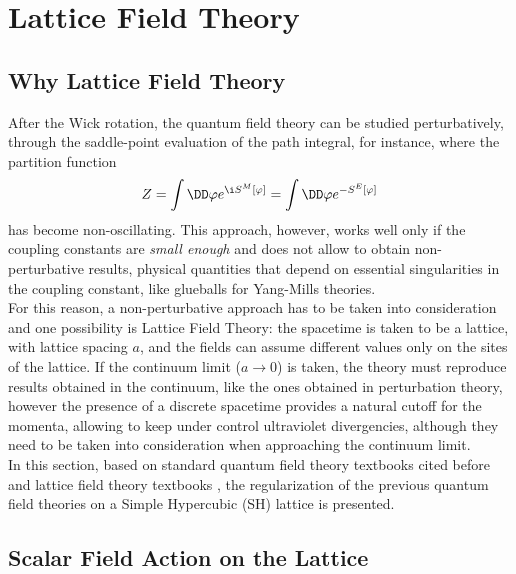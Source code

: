 \section{Lattice Field Theory}
\subsection{Why Lattice Field Theory}
After the Wick rotation, the quantum field theory can be studied perturbatively, through the saddle-point evaluation of the path integral, for instance, where the partition function
\begin{equation*}
    Z = \int\DD\varphi e^{\i S^M[\varphi]} = \int\DD\varphi e^{-S^E[\varphi]}
\end{equation*}
has become non-oscillating.
This approach, however, works well only if the coupling constants are \emph{small enough} and does not allow to obtain non-perturbative results, \ie physical quantities that depend on essential singularities in the coupling constant, like glueballs for Yang-Mills theories.\\
For this reason, a non-perturbative approach has to be taken into consideration and one possibility is Lattice Field Theory: the spacetime is taken to be a lattice, with lattice spacing $a$, and the fields can assume different values only on the sites of the lattice.
If the continuum limit ($a\to0$) is taken, the theory must reproduce results obtained in the continuum, like the ones obtained in perturbation theory, however the presence of a discrete spacetime provides a natural cutoff for the momenta, allowing to keep under control ultraviolet divergencies, although they need to be taken into consideration when approaching the continuum limit.\\
In this section, based on standard quantum field theory textbooks cited before and lattice field theory textbooks \cite{Montvay:1994cy, Gattringer:2010zz, DeGrand:2006zz}, the regularization of the previous quantum field theories on a Simple Hypercubic (SH) lattice is presented.

\subsection{Scalar Field Action on the Lattice}
